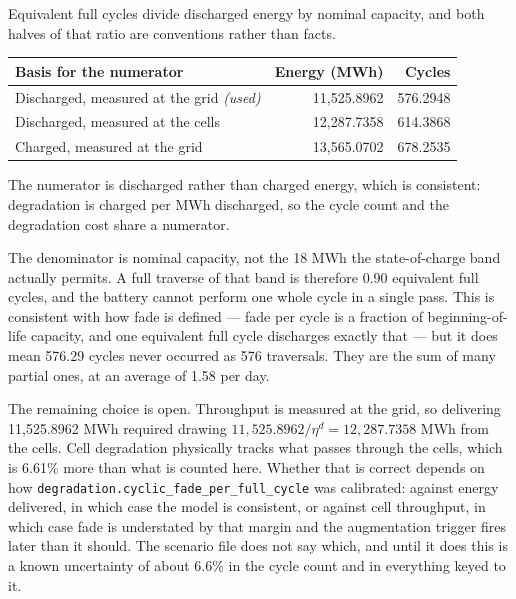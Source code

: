 \documentclass[11pt,a4paper]{article}
\numberwithin{equation}{section}
\begin{document}
Equivalent full cycles divide discharged energy by nominal capacity, and both
halves of that ratio are conventions rather than facts.

\begin{tabular}{@{}l r r@{}}
\toprule
Basis for the numerator & Energy (MWh) & Cycles \\
\midrule
Discharged, measured at the grid \emph{(used)} & 11{,}525.8962 & 576.2948 \\
Discharged, measured at the cells              & 12{,}287.7358 & 614.3868 \\
Charged, measured at the grid                  & 13{,}565.0702 & 678.2535 \\
\bottomrule
\end{tabular}

The numerator is discharged rather than charged energy, which is consistent:
degradation is charged per MWh discharged, so the cycle count and the degradation
cost share a numerator.

The denominator is nominal capacity, not the 18 MWh the state-of-charge band
actually permits. A full traverse of that band is therefore 0.90 equivalent full
cycles, and the battery cannot perform one whole cycle in a single pass. This is
consistent with how fade is defined --- fade per cycle is a fraction of
beginning-of-life capacity, and one equivalent full cycle discharges exactly that
--- but it does mean 576.29 cycles never occurred as 576 traversals. They are the
sum of many partial ones, at an average of 1.58 per day.

The remaining choice is open. Throughput is measured at the grid, so delivering
11{,}525.8962 MWh required drawing $11{,}525.8962 / \eta^{d} = 12{,}287.7358$ MWh
from the cells. Cell degradation physically tracks what passes through the cells,
which is 6.61\% more than what is counted here. Whether that is correct depends on
how \nolinkurl{degradation.cyclic_fade_per_full_cycle} was calibrated: against
energy delivered, in which case the model is consistent, or against cell
throughput, in which case fade is understated by that margin and the augmentation
trigger fires later than it should. The scenario file does not say which, and
until it does this is a known uncertainty of about 6.6\% in the cycle count and
in everything keyed to it.
\end{document}
